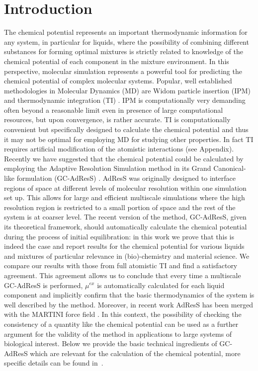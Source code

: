 \documentclass[a4paper,preprint,unsortedaddress]{revtex4-1}
\begin{document}
\section{Introduction}
The chemical potential represents an important thermodynamic information for any system, in particular for liquids, where the possibility of combining different substances for forming optimal mixtures is strictly related to knowledge of the chemical potential of each component in the mixture environment. In this perspective, molecular simulation represents a powerful tool for predicting the chemical potential of complex molecular systems. Popular, well established methodologies in Molecular Dynamics (MD) are Widom particle insertion (IPM) \cite{widom} and thermodynamic integration (TI) \cite{ti}. IPM is computationally very demanding often beyond a reasonable limit even in presence of large computational resources, but upon convergence, is rather accurate. TI is computationally convenient but specifically designed to calculate the chemical potential and thus  it may not be optimal for employing MD for studying other properties. In fact TI requires artificial modification of the atomistic interactions (see Appendix).
Recently we have suggested that the chemical potential could be calculated by employing the Adaptive Resolution Simulation method in its Grand Canonical-like formulation (GC-AdResS) \cite{prl12,jctchan,prx}.
AdResS was originally designed  to interface regions of space at different levels of molecular resolution within one simulation set up. This allows for large and efficient multiscale simulations where the high resolution region is restricted to a small portion of space and the rest of the system is at coarser level. The recent version of the method, GC-AdResS, given its theoretical framework, should automatically calculate the chemical potential during the process of initial equilibration: in this work we prove that this is indeed the case and report results for the chemical potential for various liquids and mixtures of particular relevance in (bio)-chemistry and material science. We compare our results with those from full atomistic TI and find a satisfactory agreement. This agreement allows us to conclude that every time a multiscale GC-AdResS is performed, $\mu^{ex}$ is automatically calculated for each liquid component and implicitly confirm that the basic thermodynamics of the system is well described by the method.
{Moreover, in recent work AdResS has been merged with the MARTINI force field \cite{matej-sw1,matej-sw2}. In this context, the possibility of checking the consistency of a quantity like the chemical potential can be used as a further argument for the validity of the method in applications to large systems of biological interest.}
Below we provide the basic technical ingredients of GC-AdResS which are relevant for the calculation of the chemical potential, more specific details can be found in~\cite{jctchan, prx}.
\end{document}
